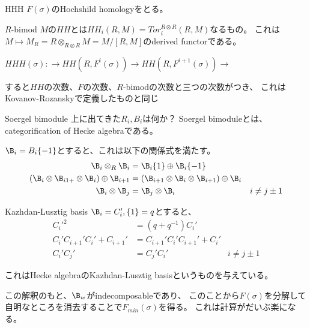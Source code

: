 \documentclass[dvipdfmx]{beamer}
\begin{document}
\begin{frame}{HHH}
$F(\sigma)$のHochshild homologyをとる。

$R$-bimod $M$の$HH$とは$HH_i(R,M)=Tor_i^{R\otimes R}(R,M)$なるもの。
これは$M \mapsto M_R=R\otimes_{R\otimes R}M=M/[R,M]$のderived functorである。

$HHH(\sigma): \to HH(R,F^i(\sigma))\to HH(R,F^{i+1}(\sigma))\to$

すると$HH$の次数、$F$の次数、$R$-bimodの次数と三つの次数がつき、
これはKovanov-Rozanskyで定義したものと同じ
\end{frame}

\begin{frame}{Soergel bimodule}
上に出てきた$R_i, B_i$は何か？
Soergel bimoduleとは、categorification of Hecke algebraである。

$\B_i=B_i\{-1\}$とすると、これは以下の関係式を満たす。
\begin{align*}
\B_i\otimes_R\B_i&=\B_i\{1\}\oplus\B_i\{-1\}\\
(\B_i\otimes\B_{i1+}\otimes \B_i)\oplus\B_{i+1}&=(\B_{i+1}\otimes\B_i\otimes\B_{i+1})\oplus\B_i\\
\B_i\otimes\B_j&=\B_j\otimes\B_i&i\neq j\pm1
\end{align*}
\end{frame}

\begin{frame}{Kazhdan-Lusztig basis}
$\B_i=C_i', \{1\}=q$とすると、
\begin{align*}
C_i'^2&=(q+q^{-1})C_i'\\
C_i'C_{i+1}'C_i'+C_{i+1}'&=C_{i+1}'C_i'C_{i+1}'+C_i'\\
C_i'C_j'&=C_j'C_i'&i\neq j\pm1
\end{align*}

これはHecke algebraのKazhdan-Lusztig basisというものを与えている。

この解釈のもと、$\B_w$がindecomposableであり、
このことから$F(\sigma)$を分解して自明なところを消去することで$F_{min}(\sigma)$を得る。
これは計算がだいぶ楽になる。
\end{frame}
\end{document}
